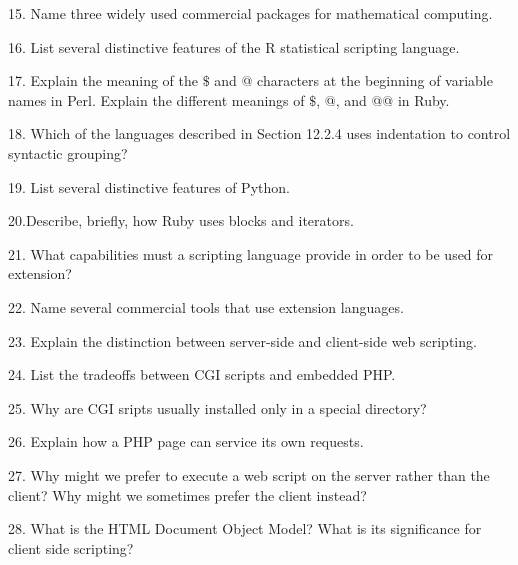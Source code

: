 15. Name three widely used commercial packages for mathematical computing.

\filbreak
\vskip 1cm

16. List several distinctive features of the R statistical scripting language.

\filbreak
\vskip 1cm

17. Explain the meaning of the $\$$ and @ characters at the beginning of variable names in Perl. Explain the different meanings of $\$$, @, and @@ in Ruby.

\filbreak
\vskip 1cm

18. Which of the languages described in Section 12.2.4 uses indentation to control syntactic grouping?

\filbreak
\vskip 1cm

19. List several distinctive features of Python.

\filbreak
\vskip 1cm

20.Describe, briefly, how Ruby uses blocks and iterators.

\filbreak
\vskip 1cm

21. What capabilities must a scripting language provide in order to be used for extension?

\filbreak
\vskip 1cm

22. Name several commercial tools that use extension languages.

\filbreak
\vskip 1cm

23. Explain the distinction between server-side and client-side web scripting.

\filbreak
\vskip 1cm

24. List the tradeoffs between CGI scripts and embedded PHP.

\filbreak
\vskip 1cm

25. Why are CGI sripts usually installed only in a special directory?

\filbreak
\vskip 1cm

26. Explain how a PHP page can service its own requests.

\filbreak
\vskip 1cm

27. Why might we prefer to execute a web script on the server rather than the client? Why might we sometimes prefer the client instead?

\filbreak
\vskip 1cm

28. What is the HTML Document Object Model? What is its significance for client side scripting?

\filbreak
\vskip 1cm

